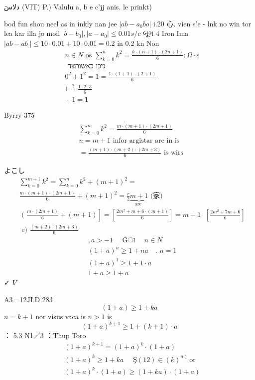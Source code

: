 \documentclass[12pt]{article}
\begin{document}
دلاسَ (VIT) P.) Valulu a, b e c'jj anis. le prinkt)

bod fun shou neel as in inkly nan jee \(\left|a b-a_{0} b o\right|\) i.20 心. vien s'e
- lnk no win tor lea kar illa jo moil \(\left|b-b_{0}\right|,\left|a-a_{0}\right| \leq 0.01 s / c\) બૂગ 4 Iron Ima \(\left|a b-a b_{.}\right| \leq 10 \cdot 0.01+10 \cdot 0.01=0.2\) in 0.2 kn Non
\[
\begin{aligned}
& n \in N \text { os } \sum_{k=0}^{n} k^{2}=\frac{h \cdot(n+1) \cdot(2 n+1)}{6}: \Omega \cdot \varepsilon \\
& \text { ניכו כאשותצה } \\
& 0^{2}+1^{2}=1=\frac{1 \cdot(1+1) \cdot(2+1)}{6} \\
& 1 \stackrel{?}{=} \frac{1 \cdot 2 \cdot 3}{6} \\
& \text { - } 1=1
\end{aligned}
\]

Byrry 375
\[
\begin{aligned}
& \dot{\sum_{k=0}^{m} k^{2}=\frac{m \cdot(m+1) \cdot(2 m+1)}{6}} \\
& n=m+1 \text { infor argistar are in is } \\
& =\frac{(m+1) \cdot(m+2) \cdot(2 m+3)}{6} \text { is wirs }
\end{aligned}
\]

よこし
\[
\begin{aligned}
& \sum_{k=0}^{m+1} k^{2}=\sum_{k=0}^{n} k^{2}+(m+1)^{2}= \\
& \frac{m \cdot(m+1) \cdot(2 m+1)}{6}+(m+1)^{2}=\frac{r}{2} \underbrace{m+1}_{\text {are }} \text { (家) } \\
& \text { ( } \left.\frac{m \cdot(2 m+1)}{6}+(m+1)\right]=\left[\frac{2 m^{2}+m+6 \cdot(m+1)}{6}\right]=m+1 \cdot\left[\frac{2 m^{2}+7 m+6}{6}\right] \\
& \text { e) } \frac{(m+2) \cdot(2 m+3)}{6}
\end{aligned}
\]
\[
\begin{aligned}
& , a>-1 \quad \text { Gा } \quad n \in N \\
& (1+a)^{n} \geq 1+n a \quad \text {. } n=1 \\
& (1+a)^{1} \geq 1+1 \cdot a \\
& 1+a \geq 1+a
\end{aligned}
\]
✓ \(V\)

A3－12JŁD 283
\[
(1+a) \geq 1+k a
\]
\(n=k+1\) nor visus vaca is \(n>1\) is
\[
(1+a)^{k+1} \geq 1+(k+1) \cdot a
\]
： 5.3 N1／3
：Thup Toro
\[
\begin{aligned}
& (1+a)^{k+1}=(1+a)^{k} \cdot(1+a) \\
& (1+a)^{k} \geq 1+k a \quad \text { Ş}(12) \in(k)^{n .)} \text { or } \\
& (1+a)^{k} \cdot(1+a) \geq(1+k a) \cdot(1+a)
\end{aligned}
\]
\end{document}
